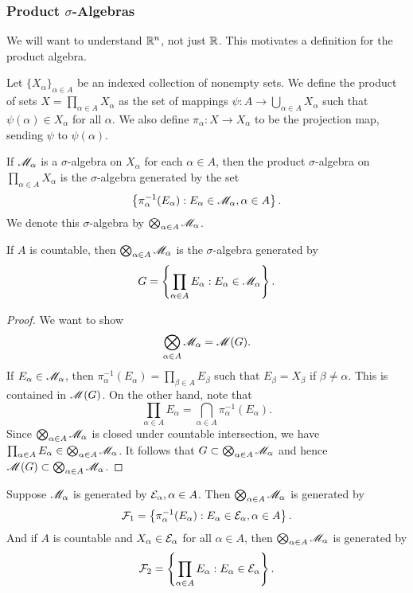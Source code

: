 \documentclass[12pt]{article} %
\begin{document}
\subsubsection{Product $\sigma$-Algebras}

We will want to understand $\mathbb{R}^n$, not just $\mathbb{R}$. This motivates a definition for the product algebra.

\begin{definition}
    Let $\{X_\alpha\}_{\alpha \in A}$ be an indexed collection of nonempty sets. We define the product of sets $X = \prod_{\alpha \in A} X_\alpha$ as the set of mappings $\psi : A \to \bigcup_{\alpha \in A} X_\alpha$ such that $\psi(\alpha) \in X_\alpha$ for all $\alpha$. We also define $\pi_\alpha : X \to X_\alpha$ to be the projection map, sending $\psi$ to $\psi(\alpha)$.

    If $\mathscr{M}_\alpha$ is a $\sigma$-algebra on $X_\alpha$ for each $\alpha \in A$, then the product $\sigma$-algebra on $\prod_{\alpha \in A} X_\alpha$ is the $\sigma$-algebra generated by the set \[\left\{ \pi_{\alpha}^{-1}(E_\alpha) : E_\alpha \in \mathscr{M}_\alpha, \alpha \in A\right\}.\] We denote this $\sigma$-algebra by $\bigotimes_{\alpha \in A} \mathscr{M}_\alpha$.
\end{definition}

\begin{proposition}\label{prop:1.3}
    If $A$ is countable, then $\bigotimes_{\alpha \in A} \mathscr{M}_\alpha$ is the $\sigma$-algebra generated by \[G = \left\{ \prod_{\alpha \in A} E_\alpha : E_\alpha \in \mathscr{M}_\alpha\right\}.\]
\end{proposition}

\begin{proof}
    We want to show \[\bigotimes_{\alpha \in A} \mathscr{M}_\alpha = \mathscr{M}(G).\]
    If $E_\alpha \in \mathscr{M}_\alpha$, then $\pi_{\alpha}^{-1}(E_\alpha) = \prod_{\beta \in A} E_\beta$ such that $E_\beta = X_\beta$ if $\beta \neq \alpha$. This is contained in $\mathscr{M}(G)$. On the other hand, note that \[\prod_{\alpha \in A}E_\alpha = \bigcap_{\alpha \in A} \pi_{\alpha}^{-1}(E_\alpha).\] Since $\bigotimes_{\alpha \in A} \mathscr{M}_\alpha$ is closed under countable intersection, we have $\prod_{\alpha \in A}E_\alpha \in \bigotimes_{\alpha \in A} \mathscr{M}_\alpha$. It follows that $G \subset \bigotimes_{\alpha \in A} \mathscr{M}_\alpha$ and hence $\mathscr{M}(G) \subset \bigotimes_{\alpha \in A} \mathscr{M}_\alpha$.
\end{proof}

\begin{proposition}\label{prop:1.4}
    Suppose $\mathscr{M}_\alpha$ is generated by $\mathcal{E}_\alpha, \alpha \in A$. Then $\bigotimes_{\alpha \in A} \mathscr{M}_\alpha$ is generated by \[\mathcal{F}_1 = \left\{ \pi_{\alpha}^{-1}(E_\alpha) : E_\alpha \in \mathcal{E}_\alpha, \alpha \in A \right\}.\] And if $A$ is countable and $X_\alpha \in \mathcal{E}_\alpha$ for all $\alpha \in A$, then $\bigotimes_{\alpha \in A} \mathscr{M}_\alpha$ is generated by \[\mathcal{F}_2 = \left\{ \prod_{\alpha \in A} E_\alpha : E_\alpha \in \mathcal{E}_\alpha \right\}.\]
\end{proposition}
\end{document}
